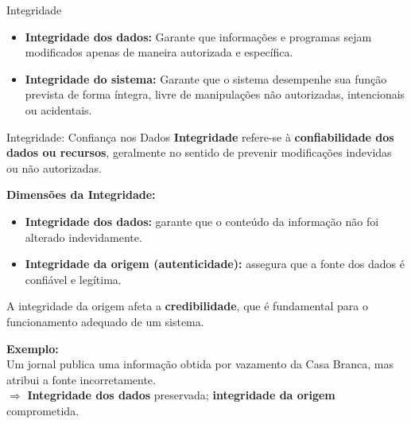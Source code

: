 \begin{frame}{Integridade}

    \begin{itemize}
      \item \textbf{Integridade dos dados:} Garante que informações e programas sejam modificados apenas de maneira autorizada e específica.
      \item \textbf{Integridade do sistema:} Garante que o sistema desempenhe sua função prevista de forma íntegra, livre de manipulações não autorizadas, intencionais ou acidentais.
    \end{itemize}

\end{frame}
\begin{frame}{Integridade: Confiança nos Dados}
    \textbf{Integridade} refere-se à \textbf{confiabilidade dos dados ou recursos}, geralmente no sentido de prevenir modificações indevidas ou não autorizadas.

    \vspace{0.3cm}
    \textbf{Dimensões da Integridade:}
    \begin{itemize}
        \item \textbf{Integridade dos dados:} garante que o conteúdo da informação não foi alterado indevidamente.
        \item \textbf{Integridade da origem (autenticidade):} assegura que a fonte dos dados é confiável e legítima.
    \end{itemize}

    \vspace{0.3cm}
    A integridade da origem afeta a \textbf{credibilidade}, que é fundamental para o funcionamento adequado de um sistema.

    \vspace{0.3cm}
    \textbf{Exemplo:} \\
    Um jornal publica uma informação obtida por vazamento da Casa Branca, mas atribui a fonte incorretamente. \\
    $\Rightarrow$ \textbf{Integridade dos dados} preservada; \textbf{integridade da origem} comprometida.
\end{frame}

